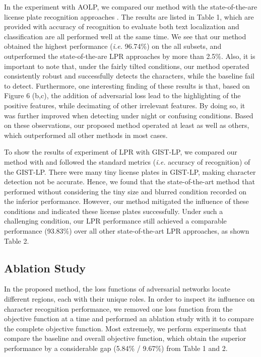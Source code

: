 \documentclass[a4paper,twoside]{article}
\begin{document}
    In the experiment with AOLP, we compared our method with the state-of-the-are license plate recognition approaches \cite{anagnostopoulos2006license,jiao2009configurable,smith2007overview,hsu2013application}. The results are listed in Table 1, which are provided with accuracy of recognition to evaluate both text localization and classification are all performed well at the same time. We see that our method obtained the highest performance (\textit{i.e.} 96.74\%) on the all subsets, and outperformed the state-of-the-are LPR approaches by more than 2.5\%. Also, it is important to note that, under the fairly tilted conditions, our method operated consistently robust and successfully detects the characters, while the baseline fail to detect. Furthermore, one interesting finding of these results is that, based on Figure 6 (b,c), the addition of adversarial loss lead to the highlighting of the positive features, while decimating of other irrelevant features. By doing so, it was further improved when detecting under night or confusing conditions. Based on these observations, our proposed method operated at least as well as others, which outperformed all other methods in most cases.
    
    To show the results of experiment of LPR with GIST-LP, we compared our method with \cite{girshick2014rich,ren2015faster} and followed the standard metrics (\textit{i.e.} accuracy of recognition) of the GIST-LP. There were many tiny license plates in GIST-LP, making character detection not be accurate. Hence, we found that the state-of-the-art method \cite{redmon2018yolov3} that performed without considering the tiny size and blurred condition recorded on the inferior performance. However, our method mitigated the influence of these conditions and indicated these license plates successfully. Under such a challenging condition, our LPR performance still achieved a comparable performance (93.83\%) over all other state-of-the-art LPR approaches, as shown Table 2.

\subsection{Ablation Study}
    In the proposed method, the loss functions of adversarial networks locate different regions, each with their unique roles. In order to inspect its influence on character recognition performance, we removed one loss function from the objective function at a time and performed an ablation study with it to compare the complete objective function. Most extremely, we perform experiments that compare the baseline and overall objective function, which obtain the superior performance by a considerable gap (5.84\% / 9.67\%) from Table 1 and 2. 
    
\end{document}

